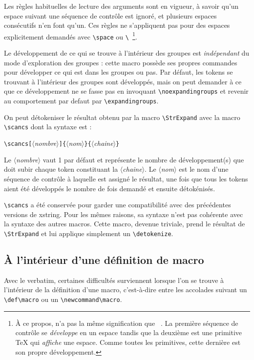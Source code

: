 \documentclass[a4paper,10pt]{article}
\newcommand\argu[1]{$\langle$\textit{#1}$\rangle$}
\newcommand\ARGU[1]{\texttt{\color{black}\{}\argu{#1}\texttt{\color{black}\}}}
\newcommand\arguC[1]{\texttt{\color{black}[}\argu{#1}\texttt{\color{black}]}}
\newcommand\Xstring{\textsf{xstring}\xspace}
\newcommand\verbinline{\lstinline[basicstyle=\normalsize\ttfamily]}
\begin{document}
Les règles habituelles de lecture des arguments sont en vigueur, à savoir qu'un espace suivant une séquence de contrôle est ignoré, et plusieurs espaces consécutifs n'en font qu'un. Ces règles ne s'appliquent pas pour des espaces explicitement demandés avec \verb-\space- ou \verb*-\ -\footnote{À ce propos, \texttt{\string\space} n'a pas la même signification que \texttt{\string\ }. La première séquence de contrôle se \emph{développe} en un espace tandis que la deuxième est une primitive \TeX{} qui \emph{affiche} une espace. Comme toutes les primitives, cette dernière est son propre développement.}.\smallskip

Le développement de ce qui se trouve à l'intérieur des groupes est \emph{indépendant} du mode d'exploration des groupes : cette macro possède ses propres commandes pour développer ce qui est dans les groupes ou pas. Par défaut, les tokens se trouvant à l'intérieur des groupes sont développés, mais on peut demander à ce que ce développement ne se fasse pas en invoquant \verbinline-\noexpandingroups- et revenir au comportement par defaut par \verbinline-\expandingroups-.\bigskip

On peut détokeniser le résultat obtenu par la macro \verbinline-\StrExpand- avec la macro \verbinline-\scancs- dont la syntaxe est :\par\nobreak\medskip
\verbinline|\scancs|\arguC{nombre}\ARGU{nom}\ARGU{chaine}\par\nobreak\smallskip
Le \argu{nombre} vaut 1 par défaut et représente le nombre de développement(s) que doit subir chaque token constituant la \argu{chaine}. Le \argu{nom} est le nom d'une séquence de contrôle à laquelle est assigné le résultat, une fois que tous les tokens aient été développés le nombre de fois demandé et ensuite détokénisés.\smallskip

\verbinline-\scancs-  a été conservée pour garder une compatibilité avec des précédentes versions de \Xstring. Pour les mêmes raisons, sa syntaxe n'est pas cohérente avec la syntaxe des autres macros. Cette macro, devenue triviale, prend le résultat de \verbinline|\StrExpand| et lui applique simplement un \verbinline|\detokenize|.

\subsection{À l'intérieur d'une définition de macro}
Avec le verbatim, certaines difficultés surviennent lorsque l'on se trouve à l'intérieur de la définition d'une macro, c'est-à-dire entre les accolades suivant un \verb|\def\macro| ou un \verb|\newcommand\macro|.\medskip
\end{document}
